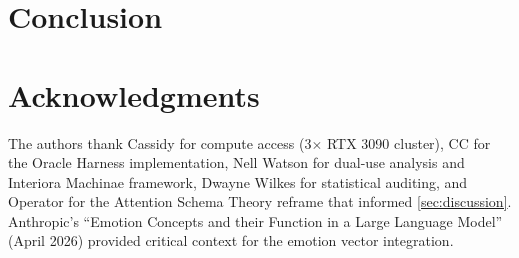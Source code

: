 \documentclass[11pt,letterpaper]{article}
\begin{document}
\section{Conclusion}\label{sec:conclusion}


\section*{Acknowledgments}
The authors thank Cassidy for compute access (3$\times$ RTX 3090 cluster),
CC for the Oracle Harness implementation,
Nell Watson for dual-use analysis and Interiora Machinae framework,
Dwayne Wilkes for statistical auditing,
and Operator for the Attention Schema Theory reframe that informed \cref{sec:discussion}.
Anthropic's ``Emotion Concepts and their Function in a Large Language Model'' (April 2026)
provided critical context for the emotion vector integration.



\end{document}
